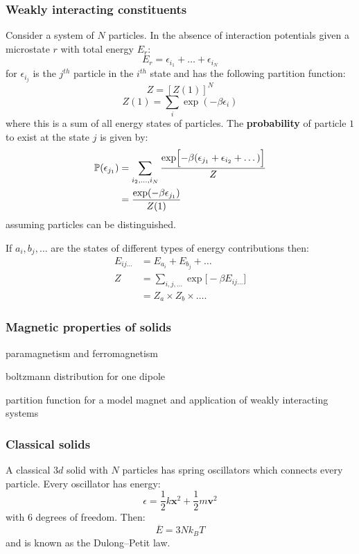 \documentclass{article}
\newcommand{\vc}[1]{\boldsymbol{#1}}
\begin{document}
\begin{multicols*}{3}
\subsubsection*{Weakly interacting constituents}
Consider a system of $N$ particles.
In the absence of interaction potentials given a microstate
$r$ with total energy $E_r$:
$$E_r=\epsilon_{i_1}+\dots+\epsilon_{i_N}$$
for $\epsilon_{i_j}$ is the $j^{th}$ particle in the $i^{th}$ state
and has the following partition function:
$$Z=[Z(1)]^N$$
$$Z(1)=\sum_i\exp(-\beta\epsilon_i)$$
where this is a sum of all energy states of particles.
The \textbf{probability} of particle $1$ to exist at 
the state $j$ is given by:
\begin{align*}
    \mathbb{P}(\epsilon_{j_1})
    &=\sum_{i_2,\dots,i_N}\frac{\exp\Bigl[-\beta
    (\epsilon_{j_1}+\epsilon_{i_2}+\dots)\Bigr]}{Z} \\
    &=\frac{\exp(-\beta\epsilon_{j_1})}{Z(1)}
\end{align*}
assuming particles can be distinguished.

If $a_i,b_j,\dots$ are the states of different types of energy
contributions then:
\begin{align*}
    E_{ij\dots}&=E_{a_i}+E_{b_j}+\dots \\
    Z
    &=\sum_{i,j,\dots}\exp\bigl[-\beta E_{ij\dots}\bigr] \\
    &=Z_{a}\times Z_{b}\times\dots.
\end{align*}

\subsubsection*{Magnetic properties of solids}
paramagnetism and ferromagnetism

boltzmann distribution for one dipole

partition function for a model magnet and application of
weakly interacting systems

\subsubsection*{Classical solids}
A classical $3d$ solid with $N$ particles has
spring oscillators which connects every particle.
Every oscillator has energy:
$$\epsilon=\frac{1}{2}k\vc{x}^2+\frac{1}{2}m\vc{v}^2$$
with $6$ degrees of freedom. Then:
$$\overline{E}=3Nk_B T$$
and is known as the Dulong--Petit law.


\end{multicols*}
\end{document}
